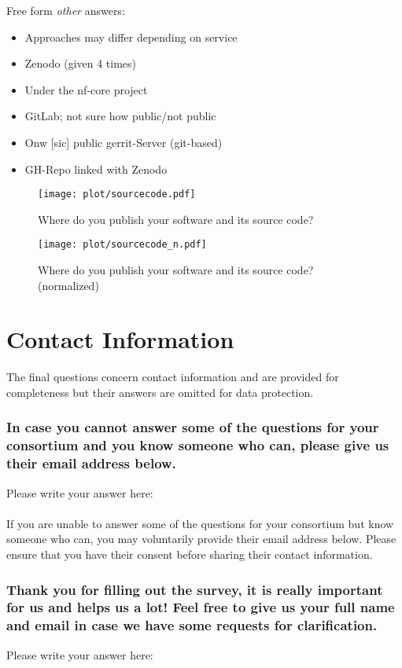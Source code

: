 \documentclass[headsepline,titlepage,twoside,12pt,toc=flat,headings=normal]{scrreprt}
\newcommand{\question}[1]{\subsubsection{#1}}
\newcommand{\otherbox}{\fbox{\phantom{This is how big an answer would be.}}}
\begin{document}
Free form \emph{other} answers:
\begin{itemize}
\item Approaches may differ depending on service
\item Zenodo (given 4 times)
\item Under the nf-core project
\item GitLab; not sure how public/not public
\item Onw [sic] public gerrit-Server (git-based)
\item GH-Repo linked with Zenodo
\end{itemize}

\clearpage
\begin{figure}[h!]
\caption[Software and source code publishing]{Where do you publish your software and its source code?}
\label{fig:sourcecode}
\texttt{[image: plot/sourcecode.pdf]}
\end{figure}

\begin{figure}[h!]
\caption[Software and source code publishing (normalized)]{Where do you publish your software and its source code?\\(normalized)}
\label{fig:sourcecode_n}
\texttt{[image: plot/sourcecode\_n.pdf]}
\end{figure}

\clearpage
\section{Contact Information}\label{final-questions}
The final questions concern contact information and are provided for completeness but their answers are omitted for data protection.

\question{In case you cannot answer some of the questions for your consortium and you know someone who can, please give us their email address below.}

Please write your answer here: \otherbox

\paragraph{}
If you are unable to answer some of the questions for your consortium but know someone who can, you may voluntarily provide their email address below.
Please ensure that you have their consent before sharing their contact information.

\question{Thank you for filling out the survey, it is really important for us and helps us a lot! Feel free to give us your full name and email in case we have some requests for clarification.}
Please write your answer here: \otherbox
\end{document}
